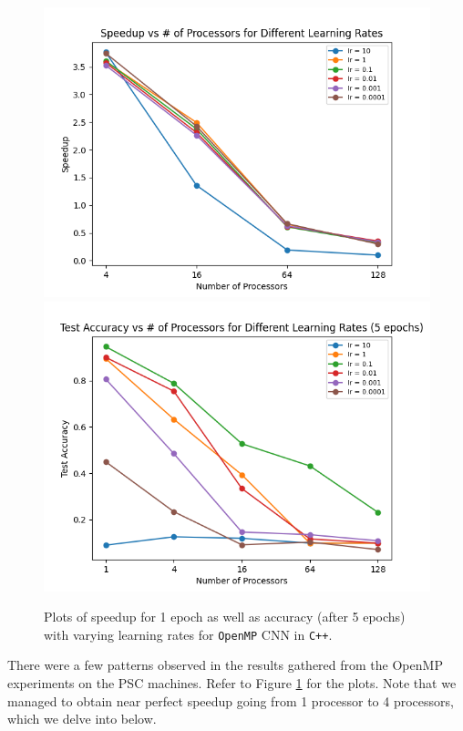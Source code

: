 \documentclass{article}
\begin{document}
\begin{figure}[!h]
    \centering
    \includegraphics[scale=0.5]{mp_lr_speed}
    \includegraphics[scale=0.5]{mp_lr_acc}
    \caption{Plots of speedup for 1 epoch as well as accuracy (after 5 epochs) with varying learning rates for \texttt{OpenMP} CNN in \texttt{C++}.}
    \label{fig:mp_lr}
\end{figure}

There were a few patterns observed in the results gathered from the OpenMP experiments on the PSC machines. Refer to Figure \ref{fig:mp_lr} for the plots. Note that we managed to obtain near perfect speedup going from 1 processor to 4 processors, which we delve into below.
\end{document}
